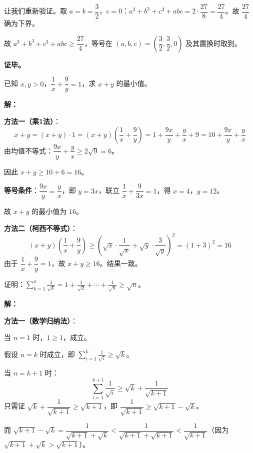 \documentclass[12pt, a4paper]{ctexart}
\begin{document}
让我们重新验证。取 $a=b=\dfrac{3}{2}$，$c=0$：$a^3+b^3+c^3+abc = 2\cdot\dfrac{27}{8} = \dfrac{27}{4}$。故 $\dfrac{27}{4}$ 确为下界。

故 $a^3+b^3+c^3+abc \geqslant \dfrac{27}{4}$，等号在 $(a,b,c) = \left(\dfrac{3}{2},\dfrac{3}{2},0\right)$ 及其置换时取到。

\textbf{证毕。}

\begin{examplebox}
已知 $x,y>0$，$\dfrac{1}{x}+\dfrac{9}{y}=1$，求 $x+y$ 的最小值。
\end{examplebox}

\textbf{解：}

\textbf{方法一（乘1法）}：
\[
x+y = (x+y)\cdot 1 = (x+y)\left(\frac{1}{x}+\frac{9}{y}\right) = 1+\frac{9x}{y}+\frac{y}{x}+9 = 10+\frac{9x}{y}+\frac{y}{x}
\]
由均值不等式：$\dfrac{9x}{y}+\dfrac{y}{x} \geqslant 2\sqrt{9} = 6$。

因此 $x+y \geqslant 10+6 = 16$。

\textbf{等号条件}：$\dfrac{9x}{y}=\dfrac{y}{x}$，即 $y=3x$，联立 $\dfrac{1}{x}+\dfrac{9}{3x}=1$，得 $x=4$，$y=12$。

故 $x+y$ 的最小值为 $\boxed{16}$。

\textbf{方法二（柯西不等式）}：
\[
(x+y)\left(\frac{1}{x}+\frac{9}{y}\right) \geqslant \left(\sqrt{x}\cdot\frac{1}{\sqrt{x}}+\sqrt{y}\cdot\frac{3}{\sqrt{y}}\right)^2 = (1+3)^2 = 16
\]
由于 $\dfrac{1}{x}+\dfrac{9}{y}=1$，故 $x+y \geqslant 16$。结果一致。

\begin{examplebox}[【例题9】放缩法与数列不等式]
证明：$\displaystyle\sum_{k=1}^{n}\frac{1}{\sqrt{k}} = 1+\frac{1}{\sqrt{2}}+\cdots+\frac{1}{\sqrt{n}} \geqslant \sqrt{n}$。
\end{examplebox}

\textbf{解：}

\textbf{方法一（数学归纳法）}：

当 $n=1$ 时，$1 \geqslant 1$，成立。

假设 $n=k$ 时成立，即 $\displaystyle\sum_{i=1}^{k}\frac{1}{\sqrt{i}} \geqslant \sqrt{k}$。

当 $n=k+1$ 时：
\[
\sum_{i=1}^{k+1}\frac{1}{\sqrt{i}} \geqslant \sqrt{k}+\frac{1}{\sqrt{k+1}}
\]
只需证 $\sqrt{k}+\dfrac{1}{\sqrt{k+1}} \geqslant \sqrt{k+1}$，即 $\dfrac{1}{\sqrt{k+1}} \geqslant \sqrt{k+1}-\sqrt{k}$。

而 $\sqrt{k+1}-\sqrt{k} = \dfrac{1}{\sqrt{k+1}+\sqrt{k}} < \dfrac{1}{\sqrt{k+1}+\sqrt{k+1}} < \dfrac{1}{\sqrt{k+1}}$（因为 $\sqrt{k+1}+\sqrt{k} > \sqrt{k+1}$）。
\end{document}
